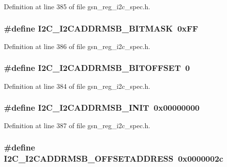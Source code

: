 Definition at line 385 of file gsn\_\-reg\_\-i2c\_\-spec.h.

\hypertarget{a00558_a118e241677d9c64bfd867c65b9f466b9}{
\subsubsection[{I2C\_\-I2CADDRMSB\_\-BITMASK}]{\setlength{\rightskip}{0pt plus 5cm}\#define I2C\_\-I2CADDRMSB\_\-BITMASK~0xFF}}
\label{a00558_a118e241677d9c64bfd867c65b9f466b9}


Definition at line 386 of file gsn\_\-reg\_\-i2c\_\-spec.h.

\hypertarget{a00558_a6c750eedbf25a8e2f62e928956160349}{
\subsubsection[{I2C\_\-I2CADDRMSB\_\-BITOFFSET}]{\setlength{\rightskip}{0pt plus 5cm}\#define I2C\_\-I2CADDRMSB\_\-BITOFFSET~0}}
\label{a00558_a6c750eedbf25a8e2f62e928956160349}


Definition at line 384 of file gsn\_\-reg\_\-i2c\_\-spec.h.

\hypertarget{a00558_a70389a1f27094754e4a394feaeb04371}{
\subsubsection[{I2C\_\-I2CADDRMSB\_\-INIT}]{\setlength{\rightskip}{0pt plus 5cm}\#define I2C\_\-I2CADDRMSB\_\-INIT~0x00000000}}
\label{a00558_a70389a1f27094754e4a394feaeb04371}


Definition at line 387 of file gsn\_\-reg\_\-i2c\_\-spec.h.

\hypertarget{a00558_aedb5f0cabb0e28667024bf455f21aaf6}{
\subsubsection[{I2C\_\-I2CADDRMSB\_\-OFFSETADDRESS}]{\setlength{\rightskip}{0pt plus 5cm}\#define I2C\_\-I2CADDRMSB\_\-OFFSETADDRESS~0x0000002c}}
\label{a00558_aedb5f0cabb0e28667024bf455f21aaf6}


